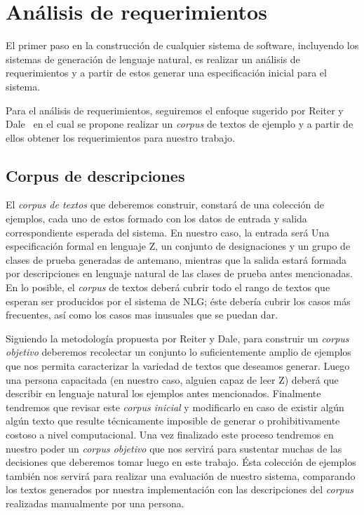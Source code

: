 \chapter{Análisis de requerimientos}
\label{cap:corpus}

El primer paso en la construcción de cualquier sistema de software, incluyendo los sistemas de generación de lenguaje natural, es realizar un análisis de requerimientos y a partir de estos generar una especificación inicial para el sistema. 

Para el análisis de requerimientos, seguiremos el enfoque sugerido por Reiter y Dale~\cite{reiter_dale} en el cual se propone realizar un \emph{corpus} de textos de ejemplo y a partir de ellos obtener los requerimientos para nuestro trabajo.

\section{Corpus de descripciones}                 

El \emph{corpus de textos} que deberemos construir, constará de una colección de ejemplos, cada uno de estos formado con los datos de entrada y salida correspondiente esperada del sistema. En nuestro caso, la entrada será Una especificación formal en lenguaje Z, un conjunto de designaciones y un grupo de clases de prueba generadas de antemano, mientras que la salida estará formada por descripciones en lenguaje natural de las clases de prueba antes mencionadas. En lo posible, el \emph{corpus} de textos deberá cubrir todo el rango de textos que esperan ser producidos por el sistema de NLG; éste debería cubrir los casos más frecuentes, así como los casos mas inusuales que se puedan dar.

Siguiendo la metodología propuesta por Reiter y Dale, para construir un \emph{corpus objetivo} deberemos recolectar un conjunto lo suficientemente amplio de ejemplos que nos permita caracterizar la variedad de textos que deseamos generar. Luego una persona capacitada (en nuestro caso, alguien capaz de leer Z) deberá que describir en lenguaje natural los ejemplos antes mencionados. Finalmente tendremos que revisar este \emph{corpus inicial} y modificarlo en caso de existir algún algún texto que resulte técnicamente imposible de generar o prohibitivamente costoso a nivel computacional. Una vez finalizado este proceso tendremos en nuestro poder un \emph{corpus objetivo} que nos servirá para sustentar muchas de las decisiones que deberemos tomar luego en este trabajo. Ésta colección de ejemplos también nos servirá para realizar una evaluación de nuestro sistema, comparando los textos generados por nuestra implementación con las descripciones del \emph{corpus} realizadas manualmente por una persona.

